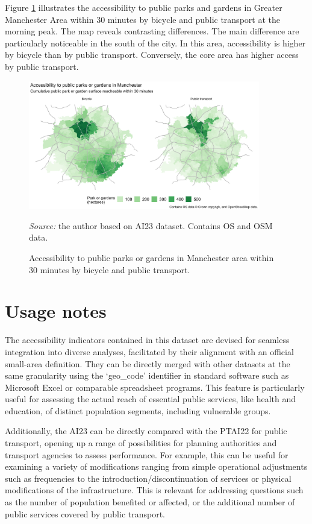 \documentclass{article}
\begin{document}
Figure \ref{fig:access-parks} illustrates the accessibility to public
parks and gardens in Greater Manchester Area within 30 minutes by
bicycle and public transport at the morning peak. The map reveals
contrasting differences. The main difference are particularly noticeable
in the south of the city. In this area, accessibility is higher by
bicycle than by public transport. Conversely, the core area has higher
access by public transport.

\begin{figure}[!htbp]
  \centering
  \includegraphics[width=0.9\textwidth]{../plots/parks_map.jpg}
  \caption{Accessibility to public parks or gardens in Manchester area within 30 minutes by bicycle and public transport.}
  \footnotesize{\textit{Source:} the author based on AI23 dataset. Contains OS and OSM data.}
  \label{fig:access-parks}
\end{figure}

\hypertarget{usage-notes}{%
\section{Usage notes}\label{usage-notes}}

The accessibility indicators contained in this dataset are devised for
seamless integration into diverse analyses, facilitated by their
alignment with an official small-area definition. They can be directly
merged with other datasets at the same granularity using the `geo\_code'
identifier in standard software such as Microsoft Excel or comparable
spreadsheet programs. This feature is particularly useful for assessing
the actual reach of essential public services, like health and
education, of distinct population segments, including vulnerable groups.

Additionally, the AI23 can be directly compared with the PTAI22 for
public transport, opening up a range of possibilities for planning
authorities and transport agencies to assess performance. For example,
this can be useful for examining a variety of modifications ranging from
simple operational adjustments such as frequencies to the
introduction/discontinuation of services or physical modifications of
the infrastructure. This is relevant for addressing questions such as
the number of population benefited or affected, or the additional number
of public services covered by public transport.
\end{document}
